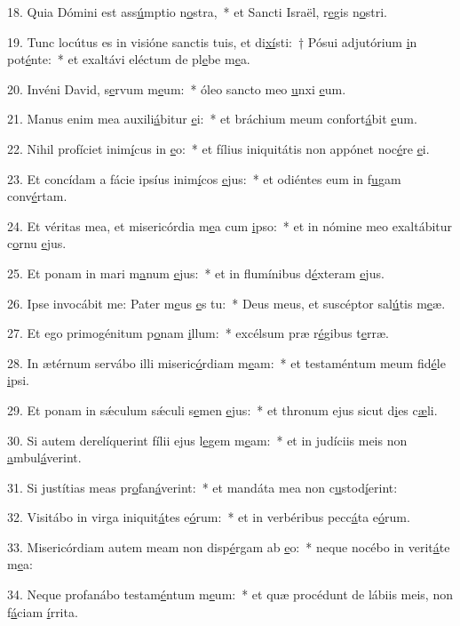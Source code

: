 18. Quia Dómini est ass\uline{ú}mptio n\uline{o}stra,~* et Sancti Israël, r\uline{e}gis n\uline{o}stri.\par 
19. Tunc locútus es in visióne sanctis tuis, et di\uline{xí}sti:~† Pósui adjutórium \uline{i}n pot\uline{é}nte:~* et exaltávi eléctum de pl\uline{e}be m\uline{e}a.\par 
20. Invéni David, s\uline{e}rvum m\uline{e}um:~* óleo sancto meo \uline{u}nxi \uline{e}um.\par 
21. Manus enim mea auxili\uline{á}bitur \uline{e}i:~* et bráchium meum confort\uline{á}bit \uline{e}um.\par 
22. Nihil profíciet inim\uline{í}cus in \uline{e}o:~* et fílius iniquitátis non appónet noc\uline{é}re \uline{e}i.\par 
23. Et concídam a fácie ipsíus inim\uline{í}cos \uline{e}jus:~* et odiéntes eum in f\uline{u}gam conv\uline{é}rtam.\par 
24. Et véritas mea, et misericórdia m\uline{e}a cum \uline{i}pso:~* et in nómine meo exaltábitur c\uline{o}rnu \uline{e}jus.\par 
25. Et ponam in mari m\uline{a}num \uline{e}jus:~* et in flumínibus d\uline{é}xteram \uline{e}jus.\par 
26. Ipse invocábit me: Pater m\uline{e}us \uline{e}s tu:~* Deus meus, et suscéptor sal\uline{ú}tis m\uline{e}æ.\par 
27. Et ego primogénitum p\uline{o}nam \uline{i}llum:~* excélsum præ r\uline{é}gibus t\uline{e}rræ.\par 
28. In ætérnum servábo illi miseric\uline{ó}rdiam m\uline{e}am:~* et testaméntum meum fid\uline{é}le \uline{i}psi.\par 
29. Et ponam in sǽculum sǽculi s\uline{e}men \uline{e}jus:~* et thronum ejus sicut d\uline{i}es c\uline{æ}li.\par 
30. Si autem derelíquerint fílii ejus l\uline{e}gem m\uline{e}am:~* et in judíciis meis non \uline{a}mbul\uline{á}verint.\par 
31. Si justítias meas pr\uline{o}fan\uline{á}verint:~* et mandáta mea non c\uline{u}stod\uline{í}erint:\par 
32. Visitábo in virga iniquit\uline{á}tes e\uline{ó}rum:~* et in verbéribus pecc\uline{á}ta e\uline{ó}rum.\par 
33. Misericórdiam autem meam non disp\uline{é}rgam ab \uline{e}o:~* neque nocébo in verit\uline{á}te m\uline{e}a:\par 
34. Neque profanábo testam\uline{é}ntum m\uline{e}um:~* et quæ procédunt de lábiis meis, non f\uline{á}ciam \uline{í}rrita.\par 
